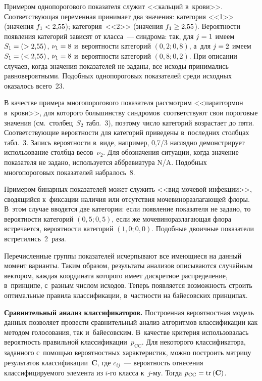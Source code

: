 \begin{multicols}{2}
     Примером однопорогового показателя служит <<кальций в~крови>>. 
Соответствующая переменная принимает два значения: категория <<1>> 
(значения $f_1\hm<2{,}55$); категория~<<2>> (значения $f_1\hm\geq 2{,}55$). 
Вероятности появления категорий зависят от класса~--- синдрома: так, для 
$j\hm=1$ имеем $S_1\hm= (>2{,}55)$, $\nu_1\hm=8$ и~вероятности категорий 
$(0{,}2; 0{,}8)$, а~для $j\hm=2$ имеем $S_1\hm= (<2{,}55)$, $\nu_1\hm=8$ 
и~вероятности категорий $(0{,}8; 0{,}2)$. При описании случаев, когда 
значения показателей не заданы, все исходы принимались равновероятными. 
Подобных однопороговых показателей среди исходных оказалось всего~23.
     
     В качестве примера многопорогового показателя рассмотрим 
<<паратгормон в~крови>>, для которого большинству 
синдромов~соответствуют свои пороговые значения (см.\ столбец~$S_2$ 
табл.~3), поэтому число категорий возрастает до пяти. Соответствующие 
вероятности для категорий приведены в~последних столбцах табл.~3. Запись 
вероятности в~виде, например, 0,7/3 наглядно демонстрирует использование 
столбца весов~$\nu_2$. Для обозначения ситуации, когда значение показателя не 
задано, используется аббревиатура N/A. Подобных многопороговых 
показателей набралось~8.
     

     
     Примером бинарных показателей может служить <<вид мочевой 
инфекции>>, сводящийся к~фиксации наличия или отсутствия мочеви\-но\-раз\-ла\-га\-ющей 
флоры. В~этом случае вводятся две \mbox{категории}: если появление 
показателя не задано, то вероятности категорий $(0{,}5; 0{,}5)$, если же 
мо\-че\-ви\-но\-раз\-ла\-га\-ющая флора встречается, вероятности категорий 
$(1{,}0;0{,}0)$. Подобные двоичные показатели встретились~2~раза.
     
     Перечисленные группы показателей исчерпывают все имеющиеся на 
данный момент варианты. Таким образом, результаты анализов описываются 
случайным вектором, каждая координата которого имеет дискретное 
распределение, в~принципе, с~разным числом исходов. Теперь появляется 
возможность строить оптимальные правила классификации, в~частности на 
байесовских прин\-ципах.
{

}
     
     \textbf{Сравнительный анализ классификаторов.} Построенная 
вероятностная модель данных позволяет провести сравнительный анализ 
алгоритмов классификации как методом голосования, так и~байесовским. 
В~качестве критерия использовалась вероятность правильной 
классификации~$p_{\mathrm{CC}}$. Для некоторого классификатора, заданного 
с~помощью вероятностных характеристик, можно построить матрицу 
результатов классификации~$\mathbf{C}$, где $c_{ij}$~--- вероятность 
отнесения классифицируемого элемента из $i$-го класса к~$j$-му. Тогда 
$p_{\mathrm{CC}}\hm= \mathrm{tr}\,(\mathbf{C})$.
     

\end{multicols}

